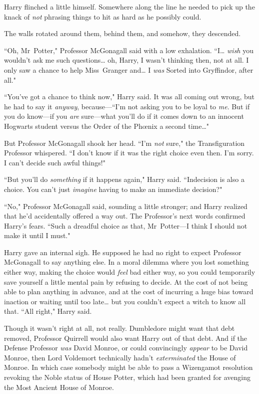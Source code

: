 Harry flinched a little himself. Somewhere along the line he needed to pick up the knack of \emph{not} phrasing things to hit as hard as he possibly could.

The walls rotated around them, behind them, and somehow, they descended.

``Oh, Mr~Potter," Professor McGonagall said with a low exhalation. ``I{\ldots} \emph{wish} you wouldn't ask me such questions{\ldots} oh, Harry, I wasn't thinking then, not at all. I only saw a chance to help Miss~Granger and{\ldots} I \emph{was} Sorted into Gryffindor, after all."

``You've got a chance to think now," Harry said. It was all coming out wrong, but he had to say it \emph{anyway}, because—``I'm not asking you to be loyal to \emph{me}. But if you do know—if you \emph{are} sure—what you'll do if it comes down to an innocent Hogwarts student versus the Order of the Phœnix a second time{\ldots}"

But Professor McGonagall shook her head. ``I'm \emph{not} sure," the Transfiguration Professor whispered. ``I don't know if it was the right choice even then. I'm sorry. I can't decide such awful things!"

``But you'll do \emph{something} if it happens again," Harry said. ``Indecision is also a choice. You can't just \emph{imagine} having to make an immediate decision?"

``No," Professor McGonagall said, sounding a little stronger; and Harry realized that he'd accidentally offered a way out. The Professor's next words confirmed Harry's fears. ``Such a dreadful choice as that, Mr~Potter—I think I should not make it until I must."

Harry gave an internal sigh. He supposed he had no right to expect Professor McGonagall to say anything else. In a moral dilemma where you lost something either way, making the choice would \emph{feel} bad either way, so you could temporarily save yourself a little mental pain by refusing to decide. At the cost of not being able to plan anything in advance, and at the cost of incurring a huge bias toward inaction or waiting until too late{\ldots} but you couldn't expect a witch to know all that. ``All right," Harry said.

Though it wasn't right at all, not really. Dumbledore might want that debt removed, Professor Quirrell would also want Harry out of that debt. And if the Defense Professor \emph{was} David Monroe, or could convincingly \emph{appear} to be David Monroe, then Lord Voldemort technically hadn't \emph{exterminated} the House of Monroe. In which case somebody might be able to pass a Wizengamot resolution revoking the Noble status of House Potter, which had been granted for avenging the Most Ancient House of Monroe.

